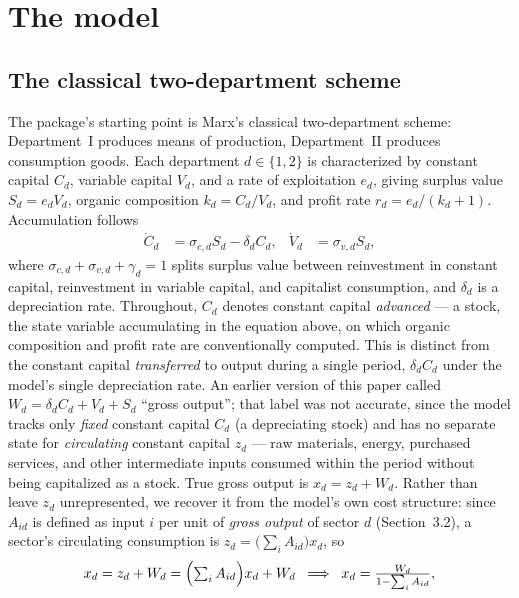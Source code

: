 \documentclass[11pt]{article}
\begin{document}
\section{The model}

\subsection{The classical two-department scheme}

The package's starting point is Marx's classical two-department scheme:
Department~I produces means of production, Department~II produces
consumption goods. Each department $d\in\{1,2\}$ is characterized by
constant capital $C_d$, variable capital $V_d$, and a rate of exploitation
$e_d$, giving surplus value $S_d = e_d V_d$, organic composition
$k_d = C_d/V_d$, and profit rate $r_d = e_d/(k_d+1)$. Accumulation follows
\begin{align}
  \dot C_d &= \sigma_{c,d} S_d - \delta_d C_d, &
  \dot V_d &= \sigma_{v,d} S_d,
\end{align}
where $\sigma_{c,d}+\sigma_{v,d}+\gamma_d=1$ splits surplus value between
reinvestment in constant capital, reinvestment in variable capital, and
capitalist consumption, and $\delta_d$ is a depreciation rate. Throughout,
$C_d$ denotes constant capital \emph{advanced} --- a stock, the state
variable accumulating in the equation above, on which organic composition
and profit rate are conventionally computed. This is distinct from the
constant capital \emph{transferred} to output during a single period,
$\delta_dC_d$ under the model's single depreciation rate. An earlier
version of this paper called $W_d=\delta_dC_d+V_d+S_d$ ``gross output'';
that label was not accurate, since the model tracks only \emph{fixed}
constant capital $C_d$ (a depreciating stock) and has no separate state
for \emph{circulating} constant capital $z_d$ --- raw materials, energy,
purchased services, and other intermediate inputs consumed within the
period without being capitalized as a stock. True gross output is
$x_d=z_d+W_d$. Rather than leave $z_d$ unrepresented, we recover it from
the model's own cost structure: since $A_{id}$ is defined as input $i$
per unit of \emph{gross output} of sector $d$ (Section~3.2), a sector's
circulating consumption is $z_d=\bigl(\sum_iA_{id}\bigr)x_d$, so
\begin{equation}
  x_d = z_d + W_d = \Bigl(\textstyle\sum_iA_{id}\Bigr)x_d + W_d
  \;\;\Longrightarrow\;\;
  x_d = \frac{W_d}{1-\sum_iA_{id}},
  \label{eq:output-bruto}
\end{equation}
\end{document}
